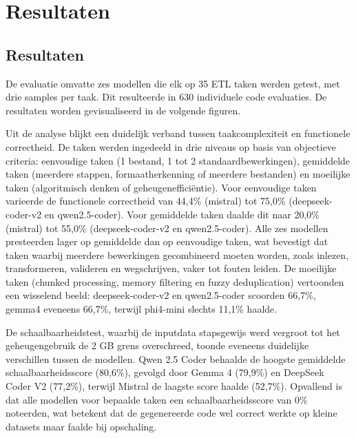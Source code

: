 
\chapter{Resultaten}%
\label{ch:resultaten}

\section{Resultaten}
\label{subsec:resultaatvisualisatie}

De evaluatie omvatte zes modellen die elk op 35 ETL taken werden getest, met drie samples per taak. Dit resulteerde in 630 individuele code evaluaties. De resultaten worden gevisualiseerd in de volgende figuren.

Uit de analyse blijkt een duidelijk verband tussen taakcomplexiteit en functionele correctheid. De taken werden ingedeeld in drie niveaus op basis van objectieve criteria: eenvoudige taken (1 bestand, 1 tot 2 standaardbewerkingen), gemiddelde taken (meerdere stappen, formaatherkenning of meerdere bestanden) en moeilijke taken (algoritmisch denken of geheugenefficiëntie). Voor eenvoudige taken varieerde de functionele correctheid van 44,4\% (mistral) tot 75,0\% (deepseek-coder-v2 en qwen2.5-coder). Voor gemiddelde taken daalde dit naar 20,0\% (mistral) tot 55,0\% (deepseek-coder-v2 en qwen2.5-coder). Alle zes modellen presteerden lager op gemiddelde dan op eenvoudige taken, wat bevestigt dat taken waarbij meerdere bewerkingen gecombineerd moeten worden, zoals inlezen, transformeren, valideren en wegschrijven, vaker tot fouten leiden. De moeilijke taken (chunked processing, memory filtering en fuzzy deduplication) vertoonden een wisselend beeld: deepseek-coder-v2 en qwen2.5-coder scoorden 66,7\%, gemma4 eveneens 66,7\%, terwijl phi4-mini slechts 11,1\% haalde.

De schaalbaarheidstest, waarbij de inputdata stapsgewijs werd vergroot tot het geheugengebruik de 2 GB grens overschreed, toonde eveneens duidelijke verschillen tussen de modellen. Qwen 2.5 Coder behaalde de hoogste gemiddelde schaalbaarheidsscore (80,6\%), gevolgd door Gemma 4 (79,9\%) en DeepSeek Coder V2 (77,2\%), terwijl Mistral de laagste score haalde (52,7\%). Opvallend is dat alle modellen voor bepaalde taken een schaalbaarheidsscore van 0\% noteerden, wat betekent dat de gegenereerde code wel correct werkte op kleine datasets maar faalde bij opschaling.


